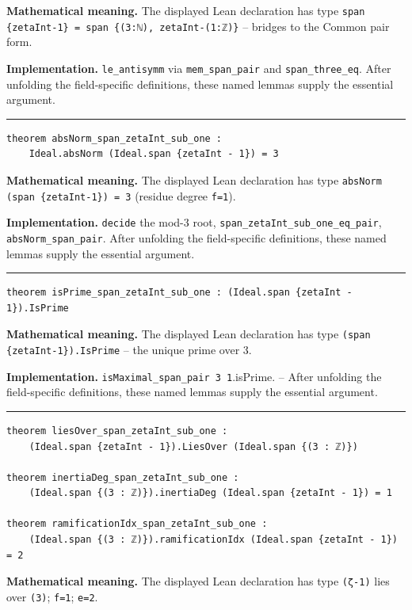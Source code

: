 \documentclass[UTF8,a4paper,11pt,fontset=fandol]{ctexart}
\theoremstyle{definition}
\newcommand{\statementsep}{\par\medskip\hrule\medskip}
\begin{document}
\noindent\textbf{Mathematical meaning.} The displayed Lean declaration has type \texttt{span \{zetaInt-1\} = span \{(3:ℕ), zetaInt-(1:ℤ)\}} -- bridges to the Common pair form.\par
\noindent\textbf{Implementation.} \texttt{le\_\allowbreak{}antisymm} via \texttt{mem\_\allowbreak{}span\_\allowbreak{}pair} and \texttt{span\_\allowbreak{}three\_\allowbreak{}eq}. After unfolding the field-specific definitions, these named lemmas supply the essential argument.\par
\statementsep
\begin{verbatim}
theorem absNorm_span_zetaInt_sub_one :
    Ideal.absNorm (Ideal.span {zetaInt - 1}) = 3
\end{verbatim}
\noindent\textbf{Mathematical meaning.} The displayed Lean declaration has type \texttt{absNorm (span \{zetaInt-1\}) = 3} (residue degree \texttt{f=1}).\par
\noindent\textbf{Implementation.} \texttt{decide} the mod-3 root, \texttt{span\_\allowbreak{}zetaInt\_\allowbreak{}sub\_\allowbreak{}one\_\allowbreak{}eq\_\allowbreak{}pair}, \texttt{absNorm\_\allowbreak{}span\_\allowbreak{}pair}. After unfolding the field-specific definitions, these named lemmas supply the essential argument.\par
\statementsep
\begin{verbatim}
theorem isPrime_span_zetaInt_sub_one : (Ideal.span {zetaInt - 1}).IsPrime
\end{verbatim}
\noindent\textbf{Mathematical meaning.} The displayed Lean declaration has type \texttt{(span \{zetaInt-1\}).\allowbreak{}IsPrime} -- the unique prime over 3.\par
\noindent\textbf{Implementation.} \texttt{isMaximal\_\allowbreak{}span\_\allowbreak{}pair 3 1}.isPrime. -- After unfolding the field-specific definitions, these named lemmas supply the essential argument.\par
\statementsep
\begin{verbatim}
theorem liesOver_span_zetaInt_sub_one :
    (Ideal.span {zetaInt - 1}).LiesOver (Ideal.span {(3 : ℤ)})

theorem inertiaDeg_span_zetaInt_sub_one :
    (Ideal.span {(3 : ℤ)}).inertiaDeg (Ideal.span {zetaInt - 1}) = 1

theorem ramificationIdx_span_zetaInt_sub_one :
    (Ideal.span {(3 : ℤ)}).ramificationIdx (Ideal.span {zetaInt - 1}) = 2
\end{verbatim}
\noindent\textbf{Mathematical meaning.} The displayed Lean declaration has type \texttt{(ζ-1)} lies over \texttt{(3)}; \texttt{f=1}; \texttt{e=2}.\par
\end{document}
